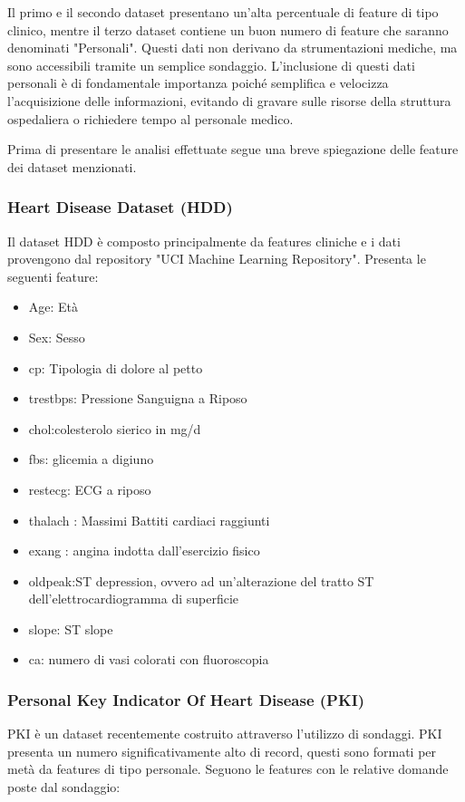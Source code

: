 \begin{flushleft}
Il primo e il secondo dataset presentano un'alta percentuale di feature di tipo clinico, mentre il terzo dataset contiene un buon numero di feature che saranno denominati "Personali". Questi dati non derivano da strumentazioni mediche, ma sono accessibili tramite un semplice sondaggio. L'inclusione di questi dati personali è di fondamentale importanza poiché semplifica e velocizza l'acquisizione delle informazioni, evitando di gravare sulle risorse della struttura ospedaliera o richiedere tempo al personale medico.

Prima di presentare le analisi effettuate segue una breve spiegazione delle feature dei dataset menzionati.

\subsubsection{Heart Disease Dataset (HDD)}
Il dataset HDD è composto principalmente da features cliniche e i dati provengono dal repository "UCI Machine Learning Repository".
Presenta le seguenti feature:
\begin{itemize}
  \item Age: Età
  \item Sex: Sesso
  \item cp: Tipologia di dolore al petto
  \item trestbps: Pressione Sanguigna a Riposo
  \item chol:colesterolo sierico in mg/d
  \item fbs: glicemia a digiuno
  \item restecg: ECG a riposo
  \item thalach : Massimi Battiti cardiaci raggiunti
  \item exang : angina indotta dall'esercizio fisico
  \item oldpeak:ST depression, ovvero ad un'alterazione del tratto ST dell'elettrocardiogramma di superficie
  \item slope: ST slope
  \item ca: numero di vasi colorati con fluoroscopia
  \end{itemize}

\subsubsection{Personal Key Indicator Of Heart Disease (PKI)}


PKI è un dataset recentemente costruito attraverso l'utilizzo di sondaggi. 
PKI presenta un numero significativamente alto di record, questi sono formati per metà da features di tipo personale.
Seguono le features con le relative domande poste dal sondaggio:



\end{flushleft}

